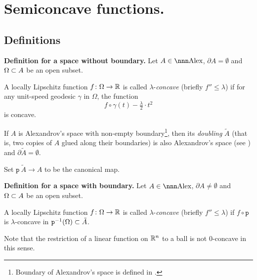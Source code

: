 \documentclass{article}
\begin{document}
\newpage





\section{Semiconcave functions.}\label{CF}

\subsection{Definitions}

\begin{thm}{\bf Definition for a space without boundary.}\label{def:with-no-bry} 
Let $A\in\Alex$, 
$\partial A=\emptyset$ 
and $\Omega\subset A$ be an open subset.

A locally Lipschitz function $f\colon\Omega \rightarrow \mathbb{R}$ is called
$\lambda$-\emph{concave} (briefly $f''\le \lambda$) if for any unit-speed geodesic $\gamma$ 
in $\Omega$, the function
$$f\circ\gamma(t)-\tfrac\lambda2{\cdot}t^2$$
is concave.
\end{thm}


If $A$ is Alexandrov's space with non-empty boundary\footnote{Boundary of Alexandrov's space is defined in \cite[7.19]{BGP}.}, 
then its \emph{doubling} $\tilde A$
(that is, two copies of $A$ glued along their boundaries) 
is also Alexandrov's space (see \cite[5.2]{perelman:spaces2}) and $\partial \tilde A=\emptyset$.

Set $\mathtt{p}\:\tilde A\to A$ to be the canonical map. 

\begin{thm}{\bf Definition for a space with boundary.}\label{def:with-bry}  Let $A\in\Alex$, $\partial A\not=\emptyset$ and $\Omega\subset A$ be an open subset.

A locally  Lipschitz function $f\colon \Omega \rightarrow \mathbb{R}$ is called $\lambda$-\emph{concave} (briefly $f''\le \lambda$) if $ f\circ \mathtt{p}$ is $\lambda$-{concave} in $\mathtt{p}^{-1}(\Omega)\subset \tilde A$.
\end{thm}


 Note that the restriction of a linear function on $\mathbb{R}^n$ to a ball is not $0$-concave in this sense.
\end{document}
